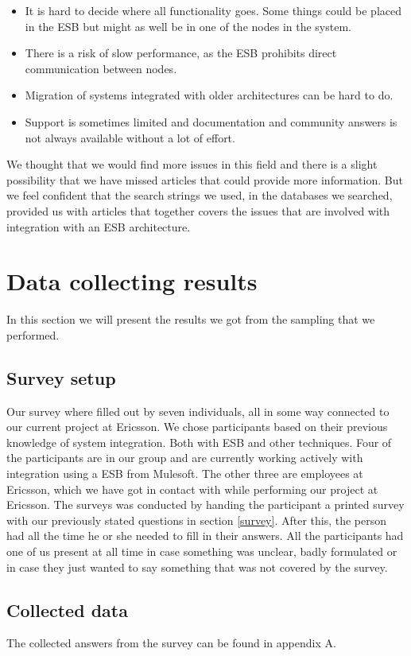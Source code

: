 \documentclass{llncs}
\begin{document}
\begin{itemize}
\item It is hard to decide where all functionality goes. Some things could be placed in the ESB but might as well be in one of the nodes in the system.
\item There is a risk of slow performance, as the ESB prohibits direct communication between nodes.
\item Migration of systems integrated with older architectures can be hard to do.
\item Support is sometimes limited and documentation and community answers is not always available without a lot of effort.
\end{itemize}

We thought that we would find more issues in this field and there is a slight possibility that we have missed articles that could provide more information. But we feel confident that the search strings we used, in the databases we searched, provided us with articles that together covers the issues that are involved with integration with an ESB architecture.

\section{Data collecting results}
In this section we will present the results we got from the sampling that we performed.
\subsection{Survey setup}

Our survey where filled out by seven individuals, all in some way connected to our current project at Ericsson. We chose participants based on their previous knowledge of system integration. Both with ESB and other techniques. Four of the participants are in our group and are currently working actively with integration using a ESB from Mulesoft. The other three are employees at Ericsson, which we have got in contact with while performing our project at Ericsson.
The surveys was conducted by handing the participant a printed survey with our previously stated questions  in section \ref{survey}. After this, the person had all the time he or she needed to fill in their answers.
All the participants had one of us present at all time in case something was unclear, badly formulated or in case they just wanted to say something that was not covered by the survey.

\subsection{Collected data}
The collected answers from the survey can be found in appendix A.
\end{document}
